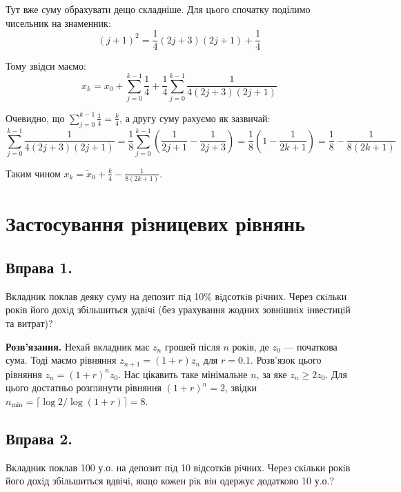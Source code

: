 \documentclass{hw_template}
\begin{document}
Тут вже суму обрахувати дещо складніше. Для цього спочатку поділимо чисельник на знаменник:
\begin{equation*}
    (j+1)^2 = \frac{1}{4}(2j+3)(2j+1) + \frac{1}{4}
\end{equation*}

Тому звідси маємо:
\begin{equation*}
    x_k = x_0 + \sum_{j=0}^{k-1} \frac{1}{4} + \frac{1}{4}\sum_{j=0}^{k-1} \frac{1}{4(2j+3)(2j+1)}
\end{equation*}

Очевидно, що $\sum_{j=0}^{k-1}\frac{1}{4} = \frac{k}{4}$, а другу суму рахуємо як зазвичай:
\begin{equation*}
    \sum_{j=0}^{k-1} \frac{1}{4(2j+3)(2j+1)} = \frac{1}{8}\sum_{j=0}^{k-1} \left(\frac{1}{2j+1} - \frac{1}{2j+3}\right) = \frac{1}{8}\left(1 - \frac{1}{2k+1}\right) = \frac{1}{8} - \frac{1}{8(2k+1)}
\end{equation*}

Таким чином $x_k = \widetilde{x}_0 + \frac{k}{4} - \frac{1}{8(2k+1)}$.

\section{Застосування різницевих рівнянь}

\subsection{Вправа 1.}
\begin{problem}
    Вкладник поклав деяку суму на депозит пiд 10\% вiдсоткiв рiчних. Через скiльки рокiв його дохiд збiльшиться удвiчi (без урахування жодних зовнiшнiх iнвестицiй та витрат)?
\end{problem}

\textbf{Розв'язання.} Нехай вкладник має $z_n$ грошей після $n$ років, де $z_0$ --- початкова сума. Тоді маємо рівняння $z_{n+1}=(1+r)z_n$ для $r=0.1$. Розв'язок цього рівняння $z_n = (1+r)^nz_0$. Нас цікавить таке мінімальне $n$, за яке $z_n \geq 2z_0$. Для цього достатньо розглянути рівняння $(1+r)^n=2$, звідки $n_{\min}=\lceil \log 2/\log (1+r) \rceil = 8$.

\subsection{Вправа 2.}\label{exercise:2}
\begin{problem}
    Вкладник поклав 100 у.о. на депозит пiд 10 вiдсоткiв рiчних. Через скiльки рокiв його дохiд збiльшиться вдвiчi, якщо кожен рiк вiн одержує додатково 10 у.о.?
\end{problem}
\end{document}
